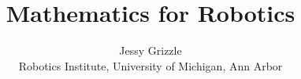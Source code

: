 \documentclass[letterpaper]{book}
\title{Mathematics for Robotics}
\date{}
\author{Jessy Grizzle\\ Robotics Institute, University of Michigan, Ann Arbor}
\begin{document}
\newtheorem{thm}{Theorem}
\newtheorem{example}[thm]{Example}
\newtheorem{nonexample}[thm]{Non-Example}
\newtheorem{prop}[thm]{Proposition}
\newtheorem{lem}[thm]{Lemma}
\newtheorem{cor}[thm]{Corollary}
\newtheorem{claim}[thm]{Claim}
\newtheorem{rem}[thm]{Remark}
\newtheorem{definition}[thm]{Definition}
\newtheorem{notation}[thm]{Notation}
\newtheorem{fact}[thm]{Fact}
\newtheorem{notvocab}[thm]{Notation and Vocabulary}
\newtheorem{question}[thm]{Question}
\newtheorem{recall}[thm]{Recall}
\newtheorem{exercise}[thm]{Exercise}
\newtheorem{summary}[thm]{Summary}
\newtheorem{keyfact}[keyfacts]{Key Fact}

\begingroup
\thispagestyle{empty}


\mbox{  }
\end{document}
